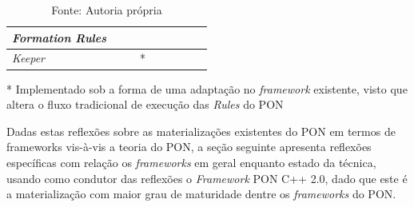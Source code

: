 \begin{table}[!htb]
\begin{threeparttable}
\begin{tabularx}{\textwidth}{|l||*{8}{X|}}
    \textit{Formation Rules}      &             &                &             &
                                  &             &                &             &                       \\\hline
    \textit{Keeper}               &             &                & *           &
                                  &             &                &             &                       \\\hline
  \end{tabularx}
  \begin{tablenotes}
    \item[*] Implementado sob a forma de uma adaptação no \textit{framework}
    existente, visto que altera o fluxo tradicional de execução das
    \textit{Rules} do PON \cite{muchalski_2012}
  \end{tablenotes}
\end{threeparttable}
\caption*{Fonte: Autoria própria}
\label{tab:conceitos}
\end{table}

Dadas estas reflexões sobre as materializações existentes do PON em termos de
frameworks vis-à-vis a teoria do PON, a seção seguinte apresenta reflexões
específicas com relação os \textit{frameworks} em geral enquanto estado da
técnica, usando como condutor das reflexões o \textit{Framework} PON C++ 2.0,
dado que este é a materialização com maior grau de maturidade dentre os
\textit{frameworks} do PON.

